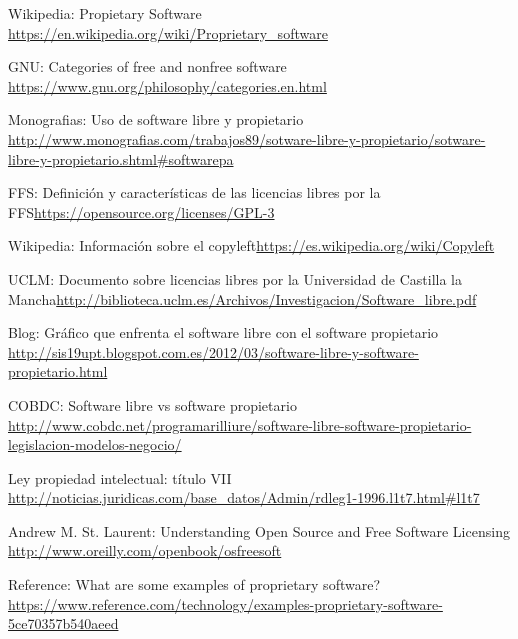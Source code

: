 \documentclass[10pt]{article}
\begin{document}
        
       \newpage 
	\begin{thebibliography}{9}
    
        Wikipedia: Propietary Software \url{https://en.wikipedia.org/wiki/Proprietary_software}
        
        GNU: Categories of free and nonfree software \url{https://www.gnu.org/philosophy/categories.en.html}
        
        Monografias: Uso de software libre y propietario
\url{http://www.monografias.com/trabajos89/sotware-libre-y-propietario/sotware-libre-y-propietario.shtml#softwarepa}

        FFS: Definición y características de las licencias libres por la FFS\url{https://opensource.org/licenses/GPL-3}
        
        Wikipedia: Información sobre el copyleft\url{https://es.wikipedia.org/wiki/Copyleft}
        
        UCLM: Documento sobre licencias libres por la Universidad de Castilla la Mancha\url{http://biblioteca.uclm.es/Archivos/Investigacion/Software\_libre.pdf}
        
        Blog: Gráfico que enfrenta el software libre con el software propietario
  \url{http://sis19upt.blogspot.com.es/2012/03/software-libre-y-software-propietario.html}
  
        COBDC: Software libre vs software propietario       \url{http://www.cobdc.net/programarilliure/software-libre-software-propietario-legislacion-modelos-negocio/}
        
        Ley propiedad intelectual: título VII
\url{http://noticias.juridicas.com/base_datos/Admin/rdleg1-1996.l1t7.html#l1t7}
        
        Andrew M. St. Laurent: Understanding Open Source and Free Software Licensing
\url{http://www.oreilly.com/openbook/osfreesoft}

        
        Reference: What are some examples of proprietary software?
\url{https://www.reference.com/technology/examples-proprietary-software-5ce70357b540aeed

}
\end{thebibliography}
\end{document}
